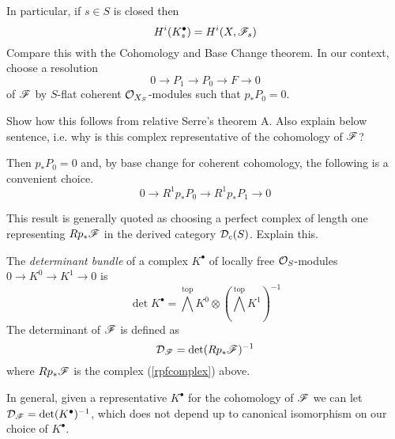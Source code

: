 \documentclass[12pt]{article}
\begin{document}
In particular, if $s \in S$ is closed then 
\begin{equation}\label{cbcclosedpoint}
    H^i(K^{\bullet}_s) = H^i(X, \mathscr{F}_s)
\end{equation}
Compare this with the Cohomology and Base Change theorem. In our context, choose a resolution
\[0 \to P_1 \to P_0 \to F \to 0\]
of $\mathscr{F}$ by $S$-flat coherent $\mathcal{O}_{X_S}$-modules such that $p_* P_0 = 0$.
\begin{todo}
    Show how this follows from relative Serre's theorem A. Also explain below sentence, i.e. why is this complex representative of the cohomology of $\mathscr{F}$?
\end{todo}
Then $p_* P_0 = 0$ and, by base change for coherent cohomology, the following is a convenient choice.
\begin{equation}\label{rpfcomplex}
    0 \to R^1 p_* P_0 \to R^1 p_* P_1 \to 0
\end{equation}
\begin{todo}
This result is generally quoted as choosing a perfect complex
of length one representing $Rp_* \mathscr{F}$ in the derived category $\mathcal{D}_c(S)$. Explain this.
\end{todo}
\begin{defn}
    The \textit{determinant bundle} of a complex $K^{\bullet}$ of locally free $\mathcal{O}_S$-modules $0 \to K^0 \to K^1 \to 0$ is
    \[\det K^{\bullet} = \bigwedge^{\text{top}} K^0 \otimes \left(\bigwedge^{\text{top}} K^1 \right)^{-1}\]
    The determinant of $\mathscr{F}$ is defined as
    \[\mathcal{D}_{\mathscr{F}} = \det(Rp_* \mathscr{F})^{-1}\]
    where $Rp_* \mathscr{F}$ is the complex (\ref{rpfcomplex}) above.
\end{defn}
In general, given a representative $K^{\bullet}$ for the cohomology of $\mathscr{F}$ we can let $\mathcal{D}_{\mathscr{F}} = \det(K^{\bullet})^{-1}$, which does not depend up to canonical isomorphism on our choice of $K^{\bullet}$. 
\end{document}
